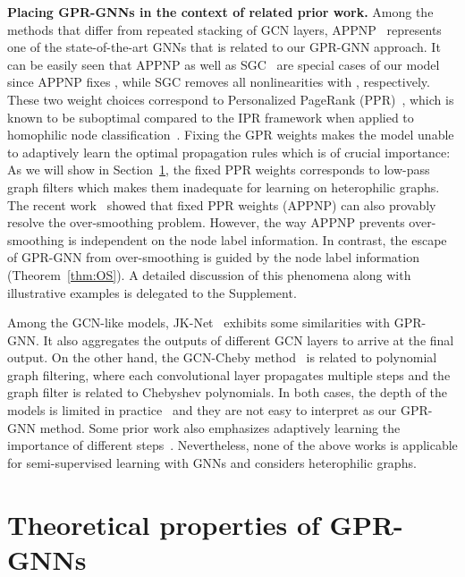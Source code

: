\documentclass{article} \usepackage{iclr2021_conference,times}
\begin{document}
\textbf{Placing GPR-GNNs in the context of related prior work. } Among the methods that differ from repeated stacking of GCN layers, APPNP~\citep{klicpera2018predict} represents one of the state-of-the-art GNNs that is related to our GPR-GNN approach. It can be easily seen that APPNP as well as SGC~\citep{wu2019simplifying} are special cases of our model since APPNP fixes ,  while SGC removes all nonlinearities with , respectively. These two weight choices correspond to Personalized PageRank (PPR)~\citep{jeh2003scaling}, which is known to be suboptimal compared to the IPR framework when applied to homophilic node classification~\citep{li2019optimizing}. Fixing the GPR weights makes the model unable to adaptively learn the optimal propagation rules which is of crucial importance: As we will show in Section~\ref{sec:theory}, the fixed PPR weights corresponds to low-pass graph filters which makes them inadequate for learning on heterophilic graphs. The recent work~\citep{klicpera2018predict} showed that fixed PPR weights (APPNP) can also provably resolve the over-smoothing problem. However, the way APPNP prevents over-smoothing is independent on the node label information. In contrast, the escape of GPR-GNN from over-smoothing is guided by the node label information (Theorem~\ref{thm:OS}). A detailed discussion of this phenomena along with illustrative examples is delegated to the Supplement.

Among the GCN-like models, JK-Net~\citep{xu2018representation} exhibits some similarities with GPR-GNN. It also aggregates the outputs of different GCN layers to arrive at the final output. On the other hand, the GCN-Cheby method~\citep{defferrard2016convolutional,kipf2017semi} is related to polynomial graph filtering, where each convolutional layer propagates multiple steps and the graph filter is related to Chebyshev polynomials. In both cases, the depth of the models is limited in practice~\citep{klicpera2018predict} and they are not easy to interpret as our GPR-GNN method. Some prior work also emphasizes adaptively learning the importance of different steps~\citep{abu2018watch,berberidis2018adaptive}. Nevertheless, none of the above works is applicable for semi-supervised learning with GNNs and considers heterophilic graphs.

\section{Theoretical properties of GPR-GNNs}\label{sec:theory}
\end{document}

